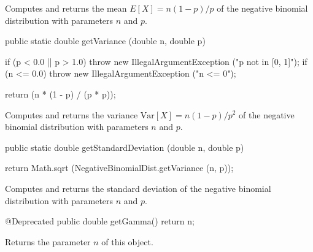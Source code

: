 \begin{tabb}  Computes and returns the mean $E[X] = n(1 - p)/p$
    of the negative binomial distribution with parameters $n$ and $p$.
\end{tabb}
\begin{htmlonly}
\end{htmlonly}
\begin{code}

   public static double getVariance (double n, double p)\begin{hide} {
      if (p < 0.0 || p > 1.0)
         throw new IllegalArgumentException ("p not in [0, 1]");
      if (n <= 0.0)
         throw new IllegalArgumentException ("n <= 0");

      return (n * (1 - p) / (p * p));
   }\end{hide}
\end{code}
\begin{tabb}  Computes and returns the variance $\mbox{Var}[X] = n(1
- p)/p^2$
   of the negative binomial distribution with parameters $n$ and $p$.
\end{tabb}
\begin{htmlonly}
\end{htmlonly}
\begin{code}

   public static double getStandardDeviation (double n, double p)\begin{hide} {
      return Math.sqrt (NegativeBinomialDist.getVariance (n, p));
   }\end{hide}
\end{code}
\begin{tabb}  Computes and returns the standard deviation of the negative
   binomial distribution with parameters $n$ and $p$.
\end{tabb}
\begin{htmlonly}
\end{htmlonly}
\begin{hide}\begin{code}

   @Deprecated
   public double getGamma() {
      return n;
   }
\end{code}
\begin{tabb} Returns the parameter $n$ of this object.
\end{tabb}\end{hide}
